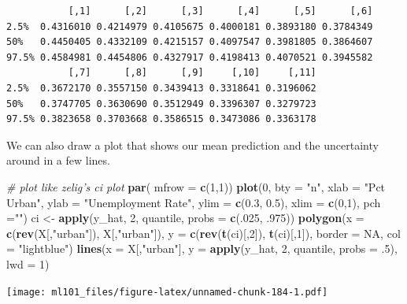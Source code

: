 \documentclass[]{article}
\newenvironment{Shaded}{\begin{snugshade}}{\end{snugshade}}
\newcommand{\CommentTok}[1]{\textcolor[rgb]{0.56,0.35,0.01}{\textit{#1}}}
\newcommand{\DataTypeTok}[1]{\textcolor[rgb]{0.13,0.29,0.53}{#1}}
\newcommand{\DecValTok}[1]{\textcolor[rgb]{0.00,0.00,0.81}{#1}}
\newcommand{\FloatTok}[1]{\textcolor[rgb]{0.00,0.00,0.81}{#1}}
\newcommand{\KeywordTok}[1]{\textcolor[rgb]{0.13,0.29,0.53}{\textbf{#1}}}
\newcommand{\NormalTok}[1]{#1}
\newcommand{\OtherTok}[1]{\textcolor[rgb]{0.56,0.35,0.01}{#1}}
\newcommand{\StringTok}[1]{\textcolor[rgb]{0.31,0.60,0.02}{#1}}
\begin{document}
\begin{verbatim}
           [,1]      [,2]      [,3]      [,4]      [,5]      [,6]
2.5%  0.4316010 0.4214979 0.4105675 0.4000181 0.3893180 0.3784349
50%   0.4450405 0.4332109 0.4215157 0.4097547 0.3981805 0.3864607
97.5% 0.4584981 0.4454806 0.4327917 0.4198413 0.4070521 0.3945582
           [,7]      [,8]      [,9]     [,10]     [,11]
2.5%  0.3672170 0.3557150 0.3439413 0.3318641 0.3196062
50%   0.3747705 0.3630690 0.3512949 0.3396307 0.3279723
97.5% 0.3823658 0.3703668 0.3586515 0.3473086 0.3363178
\end{verbatim}

We can also draw a plot that shows our mean prediction and the uncertainty around in a few lines.

\begin{Shaded}
\begin{Highlighting}[]
\CommentTok{# plot like zelig's ci plot}
\KeywordTok{par}\NormalTok{( }\DataTypeTok{mfrow =} \KeywordTok{c}\NormalTok{(}\DecValTok{1}\NormalTok{,}\DecValTok{1}\NormalTok{))}
\KeywordTok{plot}\NormalTok{(}\DecValTok{0}\NormalTok{, }\DataTypeTok{bty =} \StringTok{"n"}\NormalTok{, }\DataTypeTok{xlab =} \StringTok{"Pct Urban"}\NormalTok{, }\DataTypeTok{ylab =} \StringTok{"Unemployment Rate"}\NormalTok{, }
     \DataTypeTok{ylim =} \KeywordTok{c}\NormalTok{(}\FloatTok{0.3}\NormalTok{, }\FloatTok{0.5}\NormalTok{), }\DataTypeTok{xlim =} \KeywordTok{c}\NormalTok{(}\DecValTok{0}\NormalTok{,}\DecValTok{1}\NormalTok{), }\DataTypeTok{pch =}\StringTok{""}\NormalTok{)}
\NormalTok{ci <-}\StringTok{ }\KeywordTok{apply}\NormalTok{(y_hat, }\DecValTok{2}\NormalTok{, quantile, }\DataTypeTok{probs =} \KeywordTok{c}\NormalTok{(.}\DecValTok{025}\NormalTok{, }\FloatTok{.975}\NormalTok{))}
\KeywordTok{polygon}\NormalTok{(}\DataTypeTok{x =}  \KeywordTok{c}\NormalTok{(}\KeywordTok{rev}\NormalTok{(X[,}\StringTok{"urban"}\NormalTok{]), X[,}\StringTok{"urban"}\NormalTok{]), }
        \DataTypeTok{y =} \KeywordTok{c}\NormalTok{(}\KeywordTok{rev}\NormalTok{(}\KeywordTok{t}\NormalTok{(ci)[,}\DecValTok{2}\NormalTok{]), }\KeywordTok{t}\NormalTok{(ci)[,}\DecValTok{1}\NormalTok{]), }\DataTypeTok{border =} \OtherTok{NA}\NormalTok{,}
        \DataTypeTok{col =} \StringTok{"lightblue"}\NormalTok{)}
\KeywordTok{lines}\NormalTok{(}\DataTypeTok{x =}\NormalTok{ X[,}\StringTok{"urban"}\NormalTok{], }\DataTypeTok{y =} \KeywordTok{apply}\NormalTok{(y_hat, }\DecValTok{2}\NormalTok{, quantile, }\DataTypeTok{probs =} \FloatTok{.5}\NormalTok{), }\DataTypeTok{lwd =} \DecValTok{1}\NormalTok{)}
\end{Highlighting}
\end{Shaded}

\texttt{[image: ml101\_files/figure-latex/unnamed-chunk-184-1.pdf]}
\end{document}
